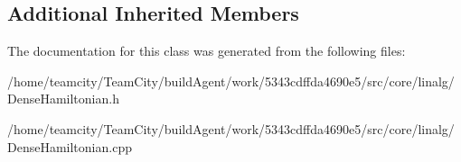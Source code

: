 \subsection*{Additional Inherited Members}


The documentation for this class was generated from the following files\+:\begin{DoxyCompactItemize}
\item 
/home/teamcity/\+Team\+City/build\+Agent/work/5343cdffda4690e5/src/core/linalg/Dense\+Hamiltonian.\+h\item 
/home/teamcity/\+Team\+City/build\+Agent/work/5343cdffda4690e5/src/core/linalg/Dense\+Hamiltonian.\+cpp\end{DoxyCompactItemize}
